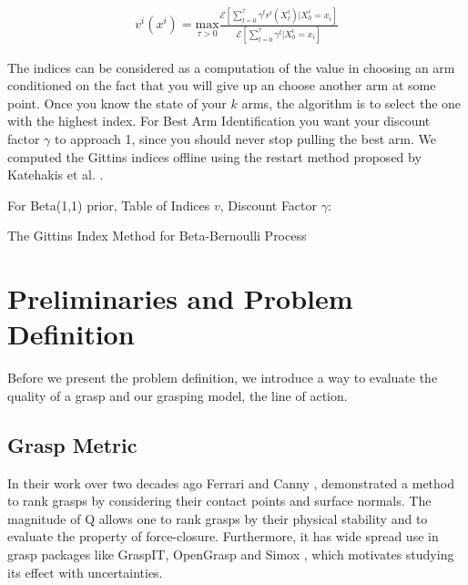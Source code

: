 \documentclass[letterpaper, 10 pt, conference]{ieeeconf}  %
\begin{document}
\vspace{-2ex}
\label{eq:git_indices}
\begin{align}
	v^i(x^i) = \underset{\tau>0}{\mbox{max}} \frac{\mathcal{E}[\sum_{t=0}^{\tau}\gamma^tr^i(X_t^i)|X_0^i = x_i]}{\mathcal{E}[\sum_{t=0}^{\tau}\gamma^t|X_0^i = x_i]}
\end{align}


The indices can be considered as a computation of the value in choosing an arm conditioned on the fact that you will give up an choose another arm at some point. Once you know the state of your $k$ arms, the algorithm is to select the one with the highest index.  For Best Arm Identification you want your discount factor $\gamma$ to approach 1, since you should never stop pulling the best arm. We computed the Gittins indices offline using the restart method proposed by Katehakis et al. \cite{katehakis1987multi}.


\begin{algorithm}
 For Beta(1,1) prior, Table of Indices $v$, Discount Factor $\gamma$: \\
 \caption{The Gittins Index Method for Beta-Bernoulli Process}
\end{algorithm}



\section{Preliminaries and Problem Definition}
Before we present the problem definition, we introduce a way to evaluate the quality of a grasp and our grasping model, the line of action.

\subsection{Grasp Metric}
In their work over two decades ago Ferrari and Canny \cite{ferrari1992}, demonstrated a method to rank grasps by considering their contact points and surface normals. The magnitude of Q allows one to rank grasps by their physical stability and to evaluate the property of force-closure. Furthermore, it has wide spread use in grasp packages like GraspIT\cite{miller2004graspit}, OpenGrasp\cite{73} and Simox \cite{vahrenkamp2010simo}, which motivates studying its effect with uncertainties. 
\end{document}
